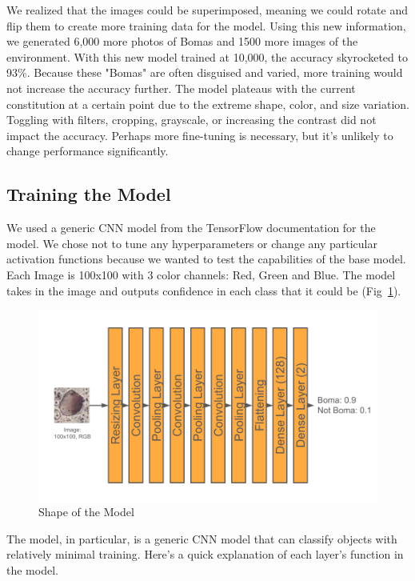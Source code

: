 \documentclass[10pt]{article}
\begin{document}
We realized that the images could be superimposed, meaning we could rotate and flip them to create more training data for the model. Using this new information, we generated 6,000 more photos of Bomas and 1500 more images of the environment. With this new model trained at 10,000, the accuracy skyrocketed to 93\%. Because these "Bomas" are often disguised and varied, more training would not increase the accuracy further. The model plateaus with the current constitution at a certain point due to the extreme shape, color, and size variation. Toggling with filters, cropping, grayscale, or increasing the contrast did not impact the accuracy. Perhaps more fine-tuning is necessary, but it's unlikely to change performance significantly.

\subsection{Training the Model}
\label{training}

We used a generic CNN model from the TensorFlow documentation for the model. We chose not to tune any hyperparameters or change any particular activation functions because we wanted to test the capabilities of the base model. Each Image is 100x100 with 3 color channels: Red, Green and Blue. The model takes in the image and outputs confidence in each class that it could be (Fig~\ref{fig:model_shape}).

\begin{figure} [H] %
    \centering
    \includegraphics[width=1\linewidth]{images/Model Shape.png}
    \caption{Shape of the Model}
    \label{fig:model_shape}
\end{figure}

The model, in particular, is a generic CNN model that can classify objects with relatively minimal training. Here's a quick explanation of each layer's function in the model.
\end{document}
